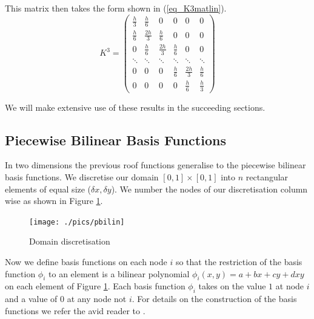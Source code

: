 \documentclass[11pt,fleqn]{article}
\theoremstyle{defstyle}
\begin{document}
This matrix then takes the form shown in (\ref{eq_K3matlin}).
\begin{equation}
K^3 = \begin{pmatrix}
\frac{h}{3} & \frac{h}{6} &0& 0 & 0 &  0\\
\frac{h}{6} & \frac{2h}{3} & \frac{h}{6} & 0 & 0 &  0\\
0 & \frac{h}{6} & \frac{2h}{3} & \frac{h}{6} & 0 & 0  \\
\ddots & \ddots & \ddots & \ddots & \ddots & \ddots \\
0 & 0 & 0  & \frac{h}{6}& \frac{2h}{3} & \frac{h}{6} \\
0 & 0 & 0 & 0 &\frac{h}{6} & \frac{h}{3}   
\end{pmatrix}
\label{eq_K3matlin}
\end{equation} 

We will make extensive use of these results in the succeeding sections.
\subsection{Piecewise Bilinear Basis Functions}
\label{section_pbbf}
In two dimensions the previous roof functions generalise to the piecewise bilinear basis functions. We discretise our domain $[0,1] \times [0,1]$ into $n$ rectangular elements of equal size ($\delta x, \delta y$). We number the nodes of our discretisation column wise as shown in Figure \ref{fig_pbilindomain}.
\begin{figure}[H] 
\centering
\texttt{[image: ./pics/pbilin]}
\caption{Domain discretisation} 
\label{fig_pbilindomain}
\end{figure}
Now we define basis functions on each node $i$ so that the restriction of the basis function $\phi_i$ to an element is a bilinear polynomial $\phi_i(x,y) = a+ bx +cy +dxy$ on each element of Figure \ref{fig_pbilindomain}. Each basis function $\phi_i$ takes on the value $1$ at node $i$ and a value of $0$ at any node not $i$. For details on the construction of the basis functions we refer the avid reader to \cite{vrb}. 
\end{document}
